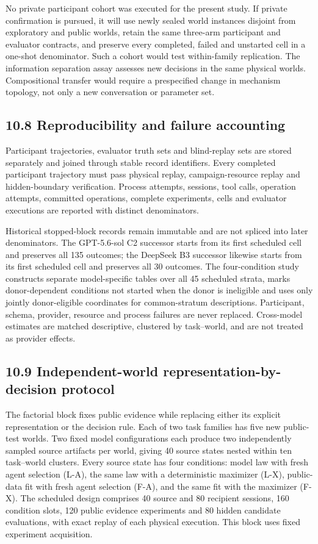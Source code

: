 \documentclass[10pt,twocolumn]{article}
\begin{document}
No private participant cohort was executed for the present study. If
private confirmation is pursued, it will use newly sealed world
instances disjoint from exploratory and public worlds, retain the same
three-arm participant and evaluator contracts, and preserve every
completed, failed and unstarted cell in a one-shot denominator. Such a
cohort would test within-family replication. The information separation
assay assesses new decisions in the same physical worlds. Compositional
transfer would require a prespecified change in mechanism topology, not
only a new conversation or parameter set.

\subsection{10.8 Reproducibility and failure
accounting}\label{reproducibility-and-failure-accounting}

Participant trajectories, evaluator truth sets and blind-replay sets are
stored separately and joined through stable record identifiers. Every
completed participant trajectory must pass physical replay,
campaign-resource replay and hidden-boundary verification. Process
attempts, sessions, tool calls, operation attempts, committed
operations, complete experiments, cells and evaluator executions are
reported with distinct denominators.

Historical stopped-block records remain immutable and are not spliced
into later denominators. The GPT-5.6-sol C2 successor starts from its
first scheduled cell and preserves all 135 outcomes; the DeepSeek B3
successor likewise starts from its first scheduled cell and preserves
all 30 outcomes. The four-condition study constructs separate
model-specific tables over all 45 scheduled strata, marks
donor-dependent conditions not started when the donor is ineligible and
uses only jointly donor-eligible coordinates for common-stratum
descriptions. Participant, schema, provider, resource and process
failures are never replaced. Cross-model estimates are matched
descriptive, clustered by task--world, and are not treated as provider
effects.

\subsection{10.9 Independent-world representation-by-decision
protocol}\label{independent-world-representation-by-decision-protocol}

The factorial block fixes public evidence while replacing either its
explicit representation or the decision rule. Each of two task families
has five new public-test worlds. Two fixed model configurations each
produce two independently sampled source artifacts per world, giving 40
source states nested within ten task--world clusters. Every source state
has four conditions: model law with fresh agent selection (L-A), the
same law with a deterministic maximizer (L-X), public-data fit with
fresh agent selection (F-A), and the same fit with the maximizer (F-X).
The scheduled design comprises 40 source and 80 recipient sessions, 160
condition slots, 120 public evidence experiments and 80 hidden candidate
evaluations, with exact replay of each physical execution. This block
uses fixed experiment acquisition.
\end{document}
